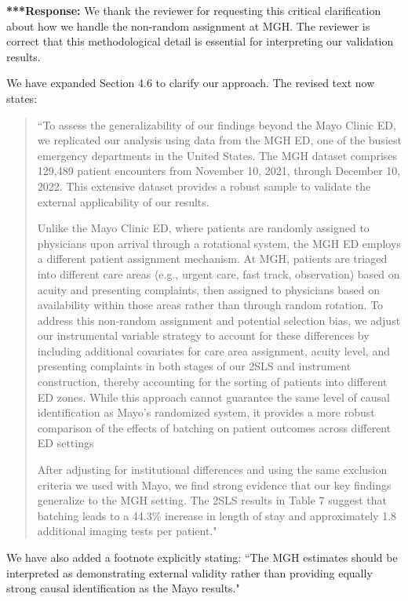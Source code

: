 \documentclass[11pt]{article}
\newcommand{\1}{\hbox{\rm 1\kern-.35em 1}}
\begin{document}
{{{{{{\noindent\textbf{***Response:} \color{blue} We thank the reviewer for requesting this critical clarification about how we handle the non-random assignment at MGH. The reviewer is correct that this methodological detail is essential for interpreting our validation results.

We have expanded Section 4.6 to clarify our approach. The revised text now states:

\begin{quote}
    ``To assess the generalizability of our findings beyond the Mayo Clinic ED, we replicated our analysis using data from the MGH ED, one of the busiest emergency departments in the United States. The MGH dataset comprises 129,489 patient encounters from November 10, 2021, through December 10, 2022. This extensive dataset provides a robust sample to validate the external applicability of our results.
    
    Unlike the Mayo Clinic ED, where patients are randomly assigned to physicians upon arrival through a rotational system, the MGH ED employs a different patient assignment mechanism. At MGH, patients are triaged into different care areas (e.g., urgent care, fast track, observation) based on acuity and presenting complaints, then assigned to physicians based on availability within those areas rather than through random rotation. To address this non-random assignment and potential selection bias, we adjust our instrumental variable strategy to account for these differences by including additional covariates for care area assignment, acuity level, and presenting complaints in both stages of our 2SLS and instrument construction, thereby accounting for the sorting of patients into different ED zones. While this approach cannot guarantee the same level of causal identification as Mayo's randomized system, it provides a more robust comparison of the effects of batching on patient outcomes across different ED settings
    
    After adjusting for institutional differences and using the same exclusion criteria we used with Mayo, we find strong evidence that our key findings generalize to the MGH setting. The 2SLS results in Table 7 suggest that batching leads to a 44.3\% increase in length of stay and approximately 1.8 additional imaging tests per patient."
\end{quote}

We have also added a footnote explicitly stating: ``The MGH estimates should be interpreted as demonstrating external validity rather than providing equally strong causal identification as the Mayo results."

}}}}}}
\end{document}
